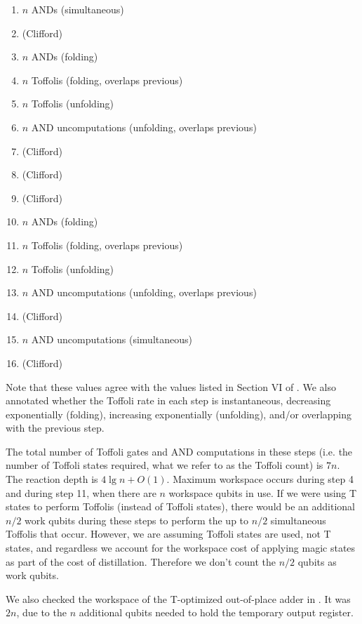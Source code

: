 \documentclass[onecolumn,unpublished]{quantumarticle}
\theoremstyle{definition}
\theoremstyle{definition}
\theoremstyle{definition}
\begin{document}
\begin{enumerate}
    \item $n$ ANDs (simultaneous)
    \item (Clifford)
    \item $n$ ANDs (folding)
    \item $n$ Toffolis (folding, overlaps previous)
    \item $n$ Toffolis (unfolding)
    \item $n$ AND uncomputations (unfolding, overlaps previous)
    \item (Clifford)
    \item (Clifford)
    \item (Clifford)
    \item $n$ ANDs (folding)
    \item $n$ Toffolis (folding, overlaps previous)
    \item $n$ Toffolis (unfolding)
    \item $n$ AND uncomputations (unfolding, overlaps previous)
    \item (Clifford)
    \item $n$ AND uncomputations (simultaneous)
    \item (Clifford)
\end{enumerate}

Note that these values agree with the values listed in Section VI of \cite{thapliyal2020lookahead}.
We also annotated whether the Toffoli rate in each step is instantaneous, decreasing exponentially (folding), increasing exponentially (unfolding), and/or overlapping with the previous step.

The total number of Toffoli gates and AND computations in these steps (i.e. the number of Toffoli states required, what we refer to as the Toffoli count) is $7n$.
The reaction depth is $4 \lg n + O(1)$.
Maximum workspace occurs during step 4 and during step 11, when there are $n$ workspace qubits in use.
If we were using T states to perform Toffolis (instead of Toffoli states), there would be an additional $n/2$ work qubits during these steps to perform the up to $n/2$ simultaneous Toffolis that occur.
However, we are assuming Toffoli states are used, not T states, and regardless we account for the workspace cost of applying magic states as part of the cost of distillation.
Therefore we don't count the $n/2$ qubits as work qubits.

We also checked the workspace of the T-optimized out-of-place adder in \cite{thapliyal2020lookahead}.
It was $2n$, due to the $n$ additional qubits needed to hold the temporary output register.
\end{document}
